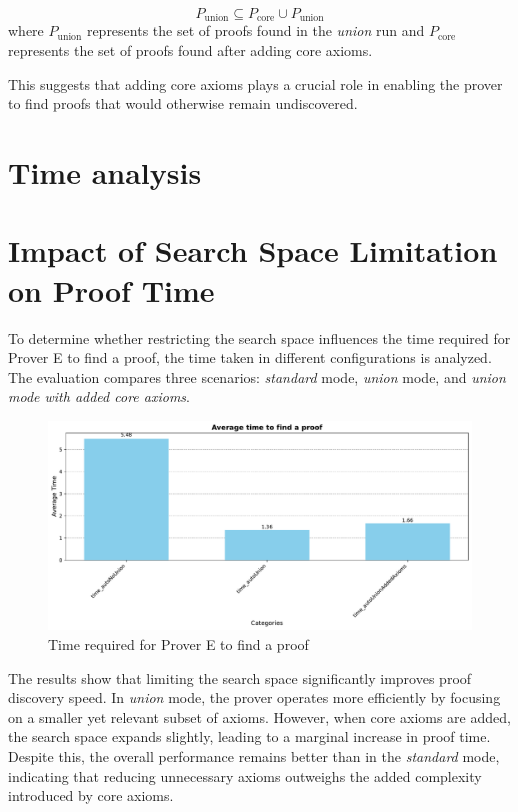 \documentclass[english,version-2020-11]{uzl-thesis}
\begin{document}
\begin{equation}
    P_{\text{union}} \subseteq P_{\text{core}} \cup P_{\text{union}}
\end{equation}
where \( P_{\text{union}} \) represents the set of proofs found in the \textit{union} run and \( P_{\text{core}} \) represents the set of proofs found after adding core axioms.


This suggests that adding core axioms plays a crucial role in enabling the prover to find proofs that would otherwise remain undiscovered.

\section{Time analysis}
\section{Impact of Search Space Limitation on Proof Time}

To determine whether restricting the search space influences the time required for Prover E to find a proof, the time taken in different configurations is analyzed. The evaluation compares three scenarios: \textit{standard} mode, \textit{union} mode, and \textit{union mode with added core axioms}.

\begin{figure}[h!]
    \centering
    \includegraphics[width=\textwidth]{time_to_find_proof.pdf}
    \caption{Time required for Prover E to find a proof}
    \label{fig:time_different_mode_1}
\end{figure}        
\FloatBarrier

The results show that limiting the search space significantly improves proof discovery speed. In \textit{union} mode, the prover operates more efficiently by focusing on a smaller yet relevant subset of axioms. However, when core axioms are added, the search space expands slightly, leading to a marginal increase in proof time. Despite this, the overall performance remains better than in the \textit{standard} mode, indicating that reducing unnecessary axioms outweighs the added complexity introduced by core axioms.
\end{document}
